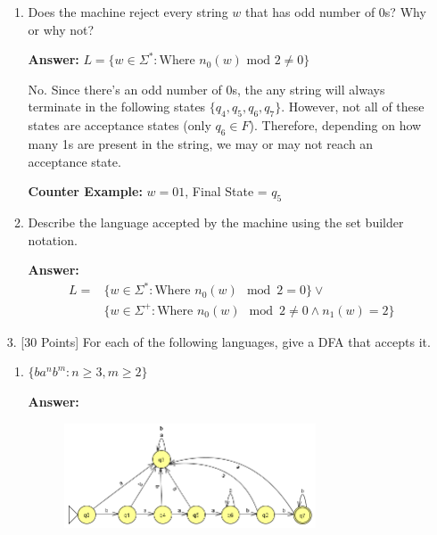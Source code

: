 \documentclass[12pt]{article}
\begin{document}
\begin{spacing}{1.5}
\begin{enumerate}
\begin{enumerate}
			      \item Does the machine reject every string $w$ that has odd number of 0s? Why or why not?

			            \noindent \textbf{Answer:} $L = \{w \in \Sigma^* : \text{Where $n_0(w)$ mod $2 \neq 0$} \}$

			            No. Since there's an odd number of 0s, the any string will always terminate in the following states $\{q_4, q_5, q_6, q_7 \}$. However, not all of these states are acceptance states (only $q_6 \in F$). Therefore, depending on how many 1s are present in the string, we may or may not reach an acceptance state.

			            \textbf{Counter Example:} $w = 01$, Final State = $q_5$

			      \item Describe the language accepted by the machine using the set builder notation.

			            \noindent \textbf{Answer:}
			            \begin{equation}
				            \begin{split}
					            L = & \{w \in \Sigma^* : \text{Where } n_0(w) \mod 2 = 0 \} \lor \\ & \{w \in \Sigma^+ : \text{Where } n_0(w) \mod 2 \neq 0 \land n_1(w) = 2 \}
				            \end{split}
			            \end{equation}

		      \end{enumerate}

		      \newpage

		\item[3.] [30 Points] For each of the following languages, give a DFA that accepts it.

		      \begin{enumerate}
			      \item $\{ba^nb^m : n \geq 3, m \geq 2 \}$

			            \noindent \textbf{Answer:}

			            \begin{figure}[h!]
				            \centering
				            \includegraphics[width=0.75\textwidth]{img/q3/q3_a.png}
			            \end{figure}


\end{enumerate}
\end{enumerate}
\end{spacing}
\end{document}
